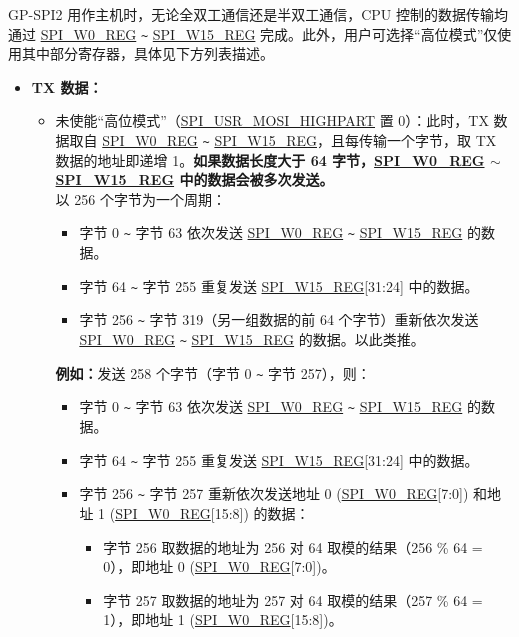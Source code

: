 \documentclass[main\_\_CN.tex]{subfiles}
\begin{document}
GP-SPI2 用作主机时，无论全双工通信还是半双工通信，CPU 控制的数据传输均通过 \hyperref[regdesc:SPIW0REG]{SPI\_W0\_REG} \verb+~+ \hyperref[regdesc:SPIW0REG]{SPI\_W15\_REG} 完成。此外，用户可选择“高位模式”仅使用其中部分寄存器，具体见下方列表描述。


\begin{itemize}
    \item \textbf{TX 数据：}
    \begin{itemize}
        \item 未使能“高位模式”（\hyperref[fielddesc:SPIUSRMOSIHIGHPART]{SPI\_USR\_MOSI\_HIGHPART} 置 0）：此时，TX 数据取自 \hyperref[regdesc:SPIW0REG]{SPI\_W0\_REG} \verb+~+ \hyperref[regdesc:SPIW0REG]{SPI\_W15\_REG}，且每传输一个字节，取 TX 数据的地址即递增 1。\textbf{如果数据长度大于 64 字节，\hyperref[regdesc:SPIW0REG]{SPI\_W0\_REG} $\sim$ \hyperref[regdesc:SPIW0REG]{SPI\_W15\_REG} 中的数据会被多次发送。}\\
        以 256 个字节为一个周期：
        \begin{itemize}
            \item 字节 0 \verb+~+ 字节 63 依次发送 \hyperref[regdesc:SPIW0REG]{SPI\_W0\_REG} \verb+~+ \hyperref[regdesc:SPIW0REG]{SPI\_W15\_REG} 的数据。
            \item 字节 64 \verb+~+ 字节 255 重复发送 \hyperref[regdesc:SPIW0REG]{SPI\_W15\_REG}[31:24] 中的数据。
            \item 字节 256 \verb+~+ 字节 319（另一组数据的前 64 个字节）重新依次发送 \hyperref[regdesc:SPIW0REG]{SPI\_W0\_REG} \verb+~+ \hyperref[regdesc:SPIW0REG]{SPI\_W15\_REG} 的数据。以此类推。
        \end{itemize}
        \textbf{例如：}发送 258 个字节（字节 0 \verb+~+ 字节 257），则：
        \begin{itemize}
            \item 字节 0 \verb+~+ 字节 63 依次发送 \hyperref[regdesc:SPIW0REG]{SPI\_W0\_REG} \verb+~+ \hyperref[regdesc:SPIW0REG]{SPI\_W15\_REG} 的数据。
            \item 字节 64 \verb+~+ 字节 255 重复发送 \hyperref[regdesc:SPIW0REG]{SPI\_W15\_REG}[31:24] 中的数据。
            \item 字节 256 \verb+~+ 字节 257 重新依次发送地址 0 (\hyperref[regdesc:SPIW0REG]{SPI\_W0\_REG}[7:0]) 和地址 1 (\hyperref[regdesc:SPIW0REG]{SPI\_W0\_REG}[15:8]) 的数据：
                \begin{itemize}
                    \item 字节 256 取数据的地址为 256 对 64 取模的结果（256 \% 64 = 0），即地址 0 (\hyperref[regdesc:SPIW0REG]{SPI\_W0\_REG}[7:0])。
                    \item 字节 257 取数据的地址为 257 对 64 取模的结果（257 \% 64 = 1），即地址 1 (\hyperref[regdesc:SPIW0REG]{SPI\_W0\_REG}[15:8])。
                \end{itemize}
        \end{itemize}


\end{itemize}
\end{itemize}
\end{document}
